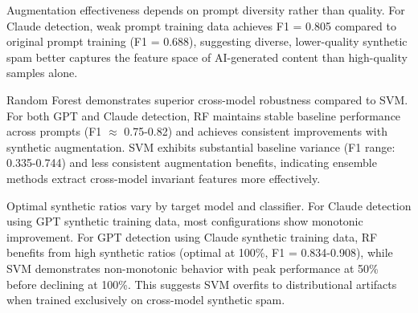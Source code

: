 Augmentation effectiveness depends on prompt diversity rather than quality. For Claude detection, weak prompt training data achieves F1 = 0.805 compared to original prompt training (F1 = 0.688), suggesting diverse, lower-quality synthetic spam better captures the feature space of AI-generated content than high-quality samples alone.

Random Forest demonstrates superior cross-model robustness compared to SVM. For both GPT and Claude detection, RF maintains stable baseline performance across prompts (F1 $\approx$ 0.75-0.82) and achieves consistent improvements with synthetic augmentation. SVM exhibits substantial baseline variance (F1 range: 0.335-0.744) and less consistent augmentation benefits, indicating ensemble methods extract cross-model invariant features more effectively.

Optimal synthetic ratios vary by target model and classifier. For Claude detection using GPT synthetic training data, most configurations show monotonic improvement. For GPT detection using Claude synthetic training data, RF benefits from high synthetic ratios (optimal at 100\%, F1 = 0.834-0.908), while SVM demonstrates non-monotonic behavior with peak performance at 50\% before declining at 100\%. This suggests SVM overfits to distributional artifacts when trained exclusively on cross-model synthetic spam.